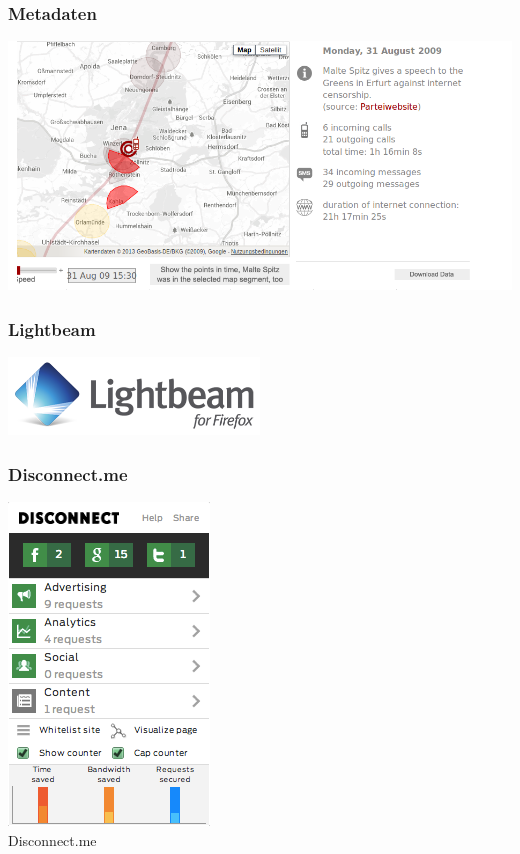 \documentclass[12pt]{beamer}
\begin{document}
\begin{frame}
    \frametitle{Metadaten}
    \includegraphics[height=0.7\textheight]{img/maltespitz.png}
\end{frame}

\begin{frame}
    \frametitle{Lightbeam}
    \begin{center} 
        \includegraphics[width=0.5\textwidth]{img/lightbeam.png} \\
    \end{center}
\end{frame}

\begin{frame}
    \frametitle{Disconnect.me}
    \begin{center} 
        \includegraphics[height=0.5\textheight]{img/disconnect.png} \\
        \Large Disconnect.me 
    \end{center}
\end{frame}
\end{document}
